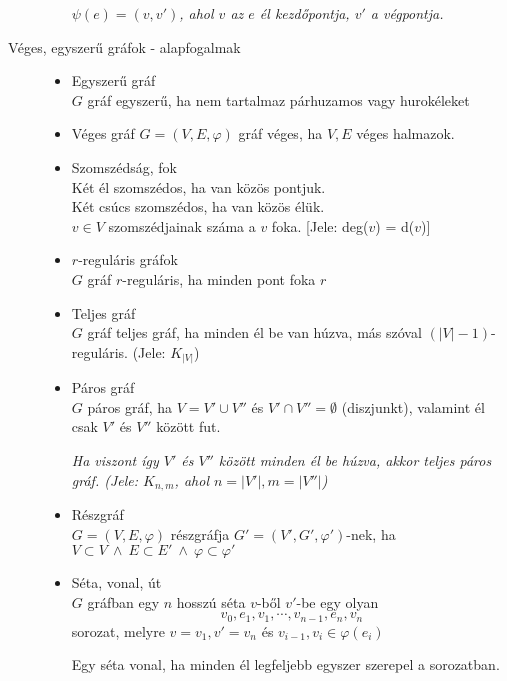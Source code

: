 \documentclass[margin=0px]{article}
\begin{document}
\begin{description}
\begin{itemize}
                  \textit{$\psi(e) = (v,v')$, ahol $v$ az $e$ él kezdőpontja, $v'$ a végpontja.}
        \end{itemize}
    \item[Véges, egyszerű gráfok - alapfogalmak] \hfill
        \begin{itemize}
            \item Egyszerű gráf \\
                  $G$ gráf egyszerű, ha nem tartalmaz párhuzamos vagy hurokéleket
            \item Véges gráf
                  $G= (V,E,\varphi)$ gráf véges, ha $V,E$ véges halmazok.
            \item Szomszédság, fok\\
                  Két él szomszédos, ha van közös pontjuk.\\
                  Két csúcs szomszédos, ha van közös élük. \\
                  $v\in V$ szomszédjainak száma a $v$ foka. [Jele: deg($v$) = d($v$)]
            \item $r$-reguláris gráfok\\
                  $G$ gráf $r$-reguláris, ha minden pont foka $r$
            \item Teljes gráf\\
                  $G$ gráf teljes gráf, ha minden él be van húzva, más szóval $(|V|-1)$-reguláris. (Jele: $K_{|V|}$)
            \item Páros gráf\\
                  $G$ páros gráf, ha $V = V' \cup V''$ és $V'\cap V'' = \emptyset$ (diszjunkt), valamint él csak $V'$ és $V''$ között fut.

                  \textit{Ha viszont így $V'$ és $V''$ között minden él be húzva, akkor teljes páros gráf. (Jele: $K_{n,m}$, ahol $n=|V'|, m=|V''|$)}
            \item Részgráf \\
                  $G = (V,E,\varphi)$ részgráfja $G'=(V',G',\varphi')$-nek, ha $V\subset V \ \land \ E \subset E' \ \land \ \varphi \subset \varphi'$
            \item Séta, vonal, út \\
                  $G$ gráfban egy $n$ hosszú séta $v$-ből $v'$-be egy olyan
                  \[v_0,e_1,v_1,\cdots,v_{n-1},e_n,v_n\]
                  sorozat, melyre $v=v_1, v'=v_n$ és $v_{i-1},v_{i} \in \varphi(e_i)$

                  Egy séta vonal, ha minden él legfeljebb egyszer szerepel a sorozatban.


\end{itemize}
\end{description}
\end{document}
